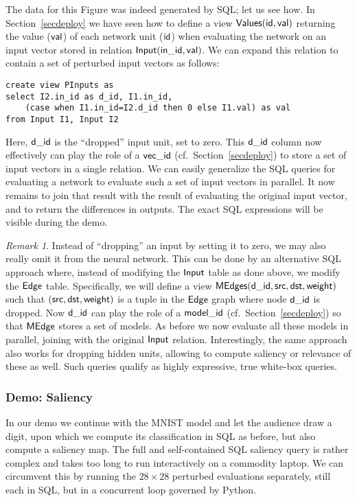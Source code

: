 \documentclass{article}
\begin{document}
The data for this Figure was indeed generated by SQL;
let us see how.
In Section~\ref{secdeploy} we have seen how to
define a view $\sf Values(id,val)$ returning the value ($\sf
val$) of each network unit ($\sf id$) when evaluating the network
on an input vector stored in relation $\sf Input(in\_id,val)$.  We can
expand this relation to contain a set of perturbed input vectors
as follows:
\begin{verbatim}
create view PInputs as
select I2.in_id as d_id, I1.in_id,
    (case when I1.in_id=I2.d_id then 0 else I1.val) as val
from Input I1, Input I2
\end{verbatim}
Here, $\sf d\_id$ is the ``dropped'' input unit, set to
zero.  This $\sf d\_id$ column now effectively
can play the role of a $\sf vec\_id$
(cf.~Section~\ref{secdeploy})
to store a set of input vectors in a
single relation.  We can easily generalize the SQL queries
for evaluating a network to evaluate such a set
of input vectors in parallel.  It now remains to join that result
with the result of evaluating the original input vector, and
to return the differences in outputs.
The exact SQL expressions will be visible during the demo.

\theoremstyle{remark}
\newtheorem*{remark}{Remark}

\begin{remark}
  Instead of ``dropping'' an input by setting it to zero, we may
  also really omit it from the neural network.
  This can be done by an alternative SQL approach where,
instead of modifying the $\sf Input$ table
  as done above, we modify the $\sf Edge$ table.  Specifically,
  we will define a view $\sf MEdges(d\_id,src,dst,weight)$ such
  that $\sf (src,dst,weight)$ is a tuple in the $\sf Edge$ graph
  where node $\sf d\_id$ is dropped.  Now $\sf d\_id$ can play the
  role of a $\sf model\_id$ (cf.~Section~\ref{secdeploy}) 
  so that $\sf MEdge$ stores a set of models.  As before we now
  evaluate all these models in parallel, joining with the original 
  $\sf Input$ relation.  Interestingly, the same approach also works
  for dropping hidden units, allowing to compute saliency or
  relevance of these as well.  Such queries qualify as highly
  expressive, true white-box queries.
\end{remark}

\subsubsection*{Demo: Saliency} In our demo we continue with the
MNIST model and let the audience draw a digit, upon which we
compute its classification in SQL as before, but also compute a
saliency map. The full and
self-contained SQL saliency query is rather complex
and takes too long to run interactively on a commodity laptop.
We can circumvent this by running the $28 \times 28$
perturbed evaluations separately, still each in SQL, but in a
concurrent loop governed by Python.
\end{document}
